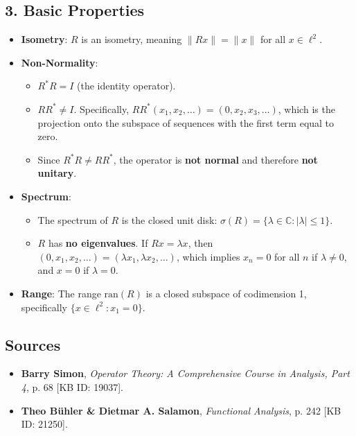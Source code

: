 \documentclass{article}
\begin{document}
\subsection*{3. Basic Properties}
\begin{itemize}
    \item \textbf{Isometry}: $R$ is an isometry, meaning $\|Rx\| = \|x\|$ for all $x \in \ell^2$.
    \item \textbf{Non-Normality}: 
    \begin{itemize}
        \item $R^*R = I$ (the identity operator).
        \item $RR^* \neq I$. Specifically, $RR^*(x_1, x_2, \dots) = (0, x_2, x_3, \dots)$, which is the projection onto the subspace of sequences with the first term equal to zero.
        \item Since $R^*R \neq RR^*$, the operator is \textbf{not normal} and therefore \textbf{not unitary}.
    \end{itemize}
    \item \textbf{Spectrum}:
    \begin{itemize}
        \item The spectrum of $R$ is the closed unit disk: $\sigma(R) = \{ \lambda \in \mathbb{C} : |\lambda| \le 1 \}$.
        \item $R$ has \textbf{no eigenvalues}. If $Rx = \lambda x$, then $(0, x_1, x_2, \dots) = (\lambda x_1, \lambda x_2, \dots)$, which implies $x_n = 0$ for all $n$ if $\lambda \neq 0$, and $x=0$ if $\lambda=0$.
    \end{itemize}
    \item \textbf{Range}: The range $\text{ran}(R)$ is a closed subspace of codimension 1, specifically $\{x \in \ell^2 : x_1 = 0\}$.
\end{itemize}

\subsection*{Sources}
\begin{itemize}
    \item \textbf{Barry Simon}, \textit{Operator Theory: A Comprehensive Course in Analysis, Part 4}, p. 68 [KB ID: 19037].
    \item \textbf{Theo Bühler \& Dietmar A. Salamon}, \textit{Functional Analysis}, p. 242 [KB ID: 21250].
\end{itemize}
\end{document}
